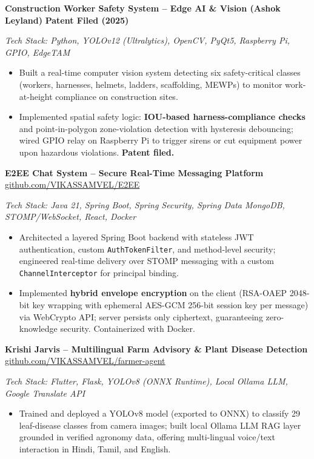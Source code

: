 \documentclass[10pt,a4paper]{article}
\newcommand{\resumeItem}[1]{\item{\small #1}}
\begin{document}
\vspace{1.5pt}
\small\textbf{Construction Worker Safety System -- Edge AI \& Vision (Ashok Leyland)} \hfill \textbf{Patent Filed (2025)}

\small\textit{Tech Stack: Python, YOLOv12 (Ultralytics), OpenCV, PyQt5, Raspberry Pi, GPIO, EdgeTAM}
\begin{itemize}
    \resumeItem{Built a real-time computer vision system detecting six safety-critical classes (workers, harnesses, helmets, ladders, scaffolding, MEWPs) to monitor work-at-height compliance on construction sites.}
    \resumeItem{Implemented spatial safety logic: \textbf{IOU-based harness-compliance checks} and point-in-polygon zone-violation detection with hysteresis debouncing; wired GPIO relay on Raspberry Pi to trigger sirens or cut equipment power upon hazardous violations. \textbf{Patent filed.}}
\end{itemize}

\vspace{1.5pt}
\small\textbf{E2EE Chat System -- Secure Real-Time Messaging Platform} \hfill \small\href{https://github.com/VIKASSAMVEL/E2EE}{github.com/VIKASSAMVEL/E2EE}

\small\textit{Tech Stack: Java 21, Spring Boot, Spring Security, Spring Data MongoDB, STOMP/WebSocket, React, Docker}
\begin{itemize}
    \resumeItem{Architected a layered Spring Boot backend with stateless JWT authentication, custom \texttt{AuthTokenFilter}, and method-level security; engineered real-time delivery over STOMP messaging with a custom \texttt{ChannelInterceptor} for principal binding.}
    \resumeItem{Implemented \textbf{hybrid envelope encryption} on the client (RSA-OAEP 2048-bit key wrapping with ephemeral AES-GCM 256-bit session key per message) via WebCrypto API; server persists only ciphertext, guaranteeing zero-knowledge security. Containerized with Docker.}
\end{itemize}

\vspace{1.5pt}
\small\textbf{Krishi Jarvis -- Multilingual Farm Advisory \& Plant Disease Detection} \hfill \small\href{https://github.com/VIKASSAMVEL/farmer-agent}{github.com/VIKASSAMVEL/farmer-agent}

\small\textit{Tech Stack: Flutter, Flask, YOLOv8 (ONNX Runtime), Local Ollama LLM, Google Translate API}
\begin{itemize}
    \resumeItem{Trained and deployed a YOLOv8 model (exported to ONNX) to classify 29 leaf-disease classes from camera images; built local Ollama LLM RAG layer grounded in verified agronomy data, offering multi-lingual voice/text interaction in Hindi, Tamil, and English.}
\end{itemize}
\end{document}
